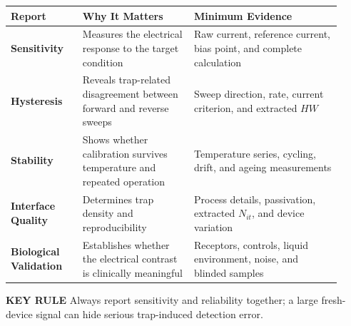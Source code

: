 \begin{tcolorbox}[
  colback=IEEEblue!5,
  colframe=IEEEblue!70!black,
  colbacktitle=IEEEblue!80!black,
  coltitle=white,
  title=TFET Biosensor Reliability Checklist,
  fonttitle=\large\bfseries\sffamily,
  toptitle=1.5mm,
  bottomtitle=1.5mm,
  boxrule=0.6pt,
  arc=0mm,
  left=4mm,right=4mm,top=2.5mm,bottom=2.5mm
]
\small
\setlength{\tabcolsep}{4pt}
\renewcommand{\arraystretch}{1.25}
\begin{tabular}{@{}>{\bfseries\RaggedRight\arraybackslash}p{0.20\linewidth}
                    >{\RaggedRight\arraybackslash}p{0.31\linewidth}
                    >{\RaggedRight\arraybackslash}p{0.41\linewidth}@{}}
  \toprule
  \textbf{Report} & \textbf{Why It Matters} & \textbf{Minimum Evidence} \\
  \midrule
  Sensitivity & Measures the electrical response to the target condition & Raw current, reference current, bias point, and complete calculation \\
  Hysteresis & Reveals trap-related disagreement between forward and reverse sweeps & Sweep direction, rate, current criterion, and extracted $HW$ \\
  Stability & Shows whether calibration survives temperature and repeated operation & Temperature series, cycling, drift, and ageing measurements \\
  Interface Quality & Determines trap density and reproducibility & Process details, passivation, extracted $N_{it}$, and device variation \\
  Biological Validation & Establishes whether the electrical contrast is clinically meaningful & Receptors, controls, liquid environment, noise, and blinded samples \\
  \bottomrule
\end{tabular}

\medskip
{\sffamily\bfseries\color{IEEEblue}KEY RULE}\quad
Always report sensitivity and reliability together; a large fresh-device signal can hide serious trap-induced detection error.
\end{tcolorbox}